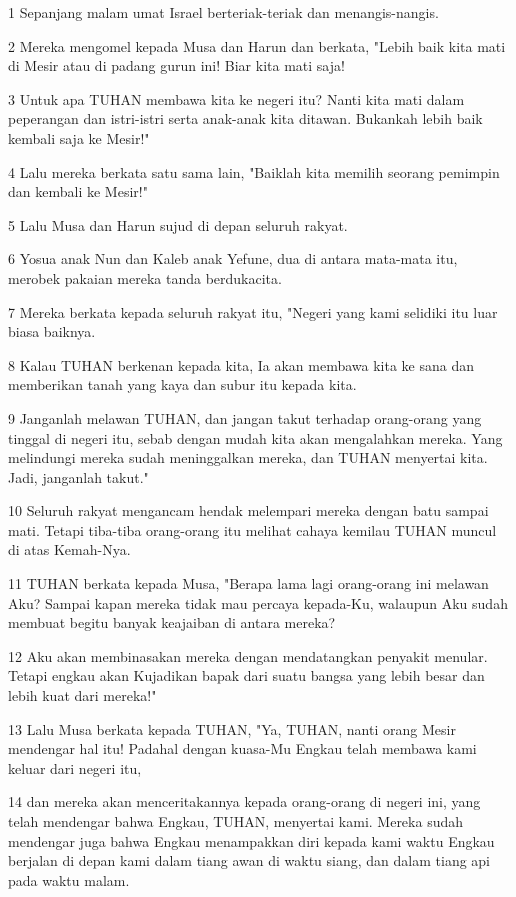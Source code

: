 \par 1 Sepanjang malam umat Israel berteriak-teriak dan menangis-nangis.
\par 2 Mereka mengomel kepada Musa dan Harun dan berkata, "Lebih baik kita mati di Mesir atau di padang gurun ini! Biar kita mati saja!
\par 3 Untuk apa TUHAN membawa kita ke negeri itu? Nanti kita mati dalam peperangan dan istri-istri serta anak-anak kita ditawan. Bukankah lebih baik kembali saja ke Mesir!"
\par 4 Lalu mereka berkata satu sama lain, "Baiklah kita memilih seorang pemimpin dan kembali ke Mesir!"
\par 5 Lalu Musa dan Harun sujud di depan seluruh rakyat.
\par 6 Yosua anak Nun dan Kaleb anak Yefune, dua di antara mata-mata itu, merobek pakaian mereka tanda berdukacita.
\par 7 Mereka berkata kepada seluruh rakyat itu, "Negeri yang kami selidiki itu luar biasa baiknya.
\par 8 Kalau TUHAN berkenan kepada kita, Ia akan membawa kita ke sana dan memberikan tanah yang kaya dan subur itu kepada kita.
\par 9 Janganlah melawan TUHAN, dan jangan takut terhadap orang-orang yang tinggal di negeri itu, sebab dengan mudah kita akan mengalahkan mereka. Yang melindungi mereka sudah meninggalkan mereka, dan TUHAN menyertai kita. Jadi, janganlah takut."
\par 10 Seluruh rakyat mengancam hendak melempari mereka dengan batu sampai mati. Tetapi tiba-tiba orang-orang itu melihat cahaya kemilau TUHAN muncul di atas Kemah-Nya.
\par 11 TUHAN berkata kepada Musa, "Berapa lama lagi orang-orang ini melawan Aku? Sampai kapan mereka tidak mau percaya kepada-Ku, walaupun Aku sudah membuat begitu banyak keajaiban di antara mereka?
\par 12 Aku akan membinasakan mereka dengan mendatangkan penyakit menular. Tetapi engkau akan Kujadikan bapak dari suatu bangsa yang lebih besar dan lebih kuat dari mereka!"
\par 13 Lalu Musa berkata kepada TUHAN, "Ya, TUHAN, nanti orang Mesir mendengar hal itu! Padahal dengan kuasa-Mu Engkau telah membawa kami keluar dari negeri itu,
\par 14 dan mereka akan menceritakannya kepada orang-orang di negeri ini, yang telah mendengar bahwa Engkau, TUHAN, menyertai kami. Mereka sudah mendengar juga bahwa Engkau menampakkan diri kepada kami waktu Engkau berjalan di depan kami dalam tiang awan di waktu siang, dan dalam tiang api pada waktu malam.
